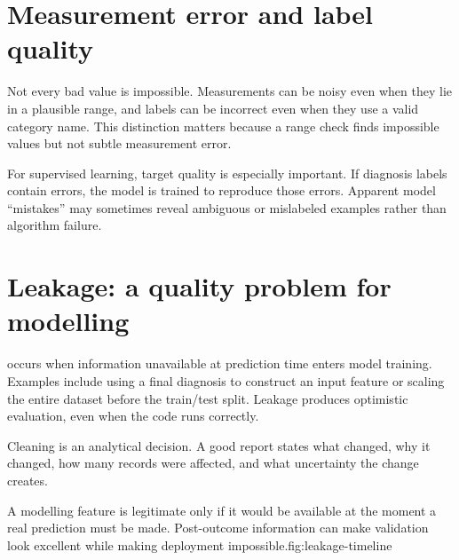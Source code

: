 \section{Measurement error and label quality}
Not every bad value is impossible. Measurements can be noisy even when they lie in a plausible range, and labels can be incorrect even when they use a valid category name. This distinction matters because a range check finds impossible values but not subtle measurement error.

For supervised learning, target quality is especially important. If diagnosis labels contain errors, the model is trained to reproduce those errors. Apparent model ``mistakes'' may sometimes reveal ambiguous or mislabeled examples rather than algorithm failure.


\section{Leakage: a quality problem for modelling}
 occurs when information unavailable at prediction time enters model training. Examples include using a final diagnosis to construct an input feature or scaling the entire dataset before the train/test split. Leakage produces optimistic evaluation, even when the code runs correctly.

\begin{keyidea}
Cleaning is an analytical decision. A good report states what changed, why it changed, how many records were affected, and what uncertainty the change creates.
\end{keyidea}


\begin{utpfig}{A modelling feature is legitimate only if it would be available at the moment a real prediction must be made. Post-outcome information can make validation look excellent while making deployment impossible.}{fig:leakage-timeline}
\end{utpfig}

